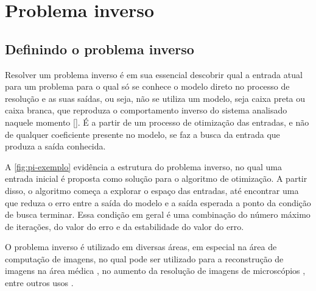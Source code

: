 \chapter{Problema inverso} \label{cha:pi}

\section{Definindo o problema inverso} \label{sec:pi-def}
Resolver um problema inverso é em sua essencial descobrir qual a entrada atual para um problema para o qual só se conhece o modelo direto no processo de resolução e as suas saídas, ou seja, não se utiliza um modelo, seja caixa preta ou caixa branca, que reproduza o comportamento inverso do sistema analisado naquele momento []. É a partir de um processo de otimização das entradas, e não de qualquer coeficiente presente no modelo, se faz a busca da entrada que produza a saída conhecida.

A \autoref{fig:pi-exemplo} evidência a estrutura do problema inverso, no qual uma entrada inicial é proposta como solução para o algoritmo de otimização. A partir disso, o algoritmo começa a explorar o espaço das entradas, até encontrar uma que reduza o erro entre a saída do modelo e a saída esperada a ponto da condição de busca terminar. Essa condição em geral é uma combinação do número máximo de iterações, do valor do erro e da estabilidade do valor do erro.


O problema inverso é utilizado em diversas áreas, em especial na área de computação de imagens, no qual pode ser utilizado para a reconstrução de imagens na área médica \cite{mccann2016fast}, no aumento da resolução de imagens de microscópios \cite{kellman2019data}, entre outros usos \cite{9084378}.

